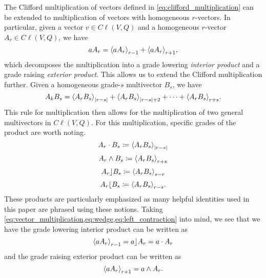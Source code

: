 The Clifford multiplication of vectors defined in \ref{eq:clifford_multiplication} can be extended to multiplication of vectors with homogeneous $r$-vectors.  In particular, given a vector $v \in C\ell(V,Q)$ and a homogeneous $r$-vector $A_r \in C\ell(V,Q)$, we have
\begin{equation}
\label{eq:vector_multiplication}
aA_r = \proj{r-1}{aA_r} + \proj{r+1}{aA_r},
\end{equation}
which decomposes the multiplication into a grade lowering \emph{interior product} and a grade raising \emph{exterior product}.  This allows us to extend the Clifford multiplication further. Given a homogeneous grade-$s$ multivector $B_s$, we have
\begin{equation}
\label{eq:general_clifford_multiplication}
A_k B_s = \proj{|r-s|}{A_rB_s} + \proj{|r-s|+2}{A_rB_s} + \cdots + \proj{r+s}{A_rB_s}.
\end{equation}
This rule for multiplication then allows for the multiplication of two general multivectors in $C\ell(V,Q)$. For this multiplication, specific grades of the product are worth noting.
\begin{equation}
\label{eq:dot}
    A_r \cdot B_s \coloneqq \proj{|r-s|}{A_r B_s}
\end{equation}
\begin{equation}
\label{eq:wedge}
    A_r \wedge B_s \coloneqq \proj{r+s}{A_r B_s}
\end{equation}
\begin{equation}
\label{eq:left_contraction}
    A_r \rfloor B_s \coloneqq \proj{s-r}{A_r B_s}
\end{equation}
\begin{equation}
\label{eq:right_contraction}
    A_r \lfloor B_s \coloneqq \proj{r-s}{A_r B_s}.
\end{equation}
These products are particularly emphasized as many helpful identities used in this paper are phrased using these notions. Taking \cref{eq:vector_multiplication,eq:wedge,eq:left_contraction} into mind, we see that we have the grade lowering interior product can be written as
\begin{equation}
    \proj{r-1}{aA_r} = a\rfloor A_r = a \cdot A_r
\end{equation}
and the grade raising exterior product can be written as
\begin{equation}
    \proj{r+1}{aA_r} = a \wedge A_r.
\end{equation}

